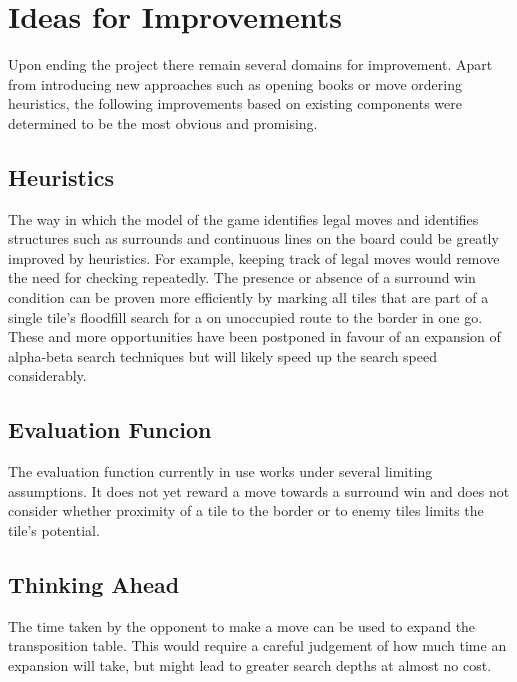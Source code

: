 \section{Ideas for Improvements}
Upon ending the project there remain several domains for improvement. Apart from introducing new approaches such as opening books or move ordering heuristics, the following improvements based on existing components were determined to be the most obvious and promising.

\subsection{Heuristics}
The way in which the model of the game identifies legal moves and identifies structures such as surrounds and continuous lines on the board could be greatly improved by heuristics. For example, keeping track of legal moves would remove the need for checking repeatedly. The presence or absence of a surround win condition can be proven more efficiently by marking all tiles that are part of a single tile's floodfill search for a on unoccupied route to the border in one go. These and more opportunities have been postponed in favour of an expansion of alpha-beta search techniques but will likely speed up the search speed considerably.

\subsection{Evaluation Funcion}
The evaluation function currently in use works under several limiting assumptions. It does not yet reward a move towards a surround win and does not consider whether proximity of a tile to the border or to enemy tiles limits the tile's potential.

\subsection{Thinking Ahead}
The time taken by the opponent to make a move can be used to expand the transposition table. This would require a careful judgement of how much time an expansion will take, but might lead to greater search depths at almost no cost.